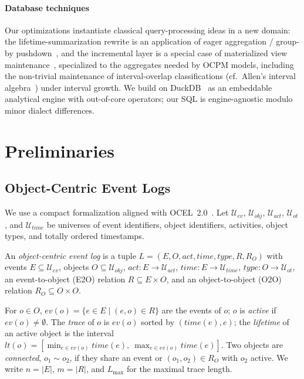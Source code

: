 \documentclass[sigconf, nonacm]{acmart}
\newcommand{\ocel}{OCEL~2.0\xspace}
\begin{document}
\paragraph{Database techniques}
Our optimizations instantiate classical query-processing ideas in a new domain: the lifetime-summarization rewrite is an application of eager aggregation / group-by pushdown~\cite{yan1995eager}, and the incremental layer is a special case of materialized view maintenance~\cite{gupta1995ivm,dbtoaster}, specialized to the aggregates needed by OCPM models, including the non-trivial maintenance of interval-overlap classifications (cf.\ Allen's interval algebra~\cite{allen1983}) under interval growth. We build on DuckDB~\cite{duckdb} as an embeddable analytical engine with out-of-core operators; our SQL is engine-agnostic modulo minor dialect differences.

\section{Preliminaries}
\label{sec:prelim}

\subsection{Object-Centric Event Logs}
We use a compact formalization aligned with \ocel~\cite{ocel2}. Let $\mathcal{U}_{ev}$, $\mathcal{U}_{obj}$, $\mathcal{U}_{act}$, $\mathcal{U}_{ot}$, and $\mathcal{U}_{time}$ be universes of event identifiers, object identifiers, activities, object types, and totally ordered timestamps.

\begin{definition}[OCEL]
\label{def:ocel}
An \emph{object-centric event log} is a tuple $L=(E, O, \mathit{act}, \mathit{time}, \mathit{type}, R, R_{O})$ with events $E\subseteq\mathcal{U}_{ev}$, objects $O\subseteq\mathcal{U}_{obj}$, $\mathit{act}\colon E\to\mathcal{U}_{act}$, $\mathit{time}\colon E\to\mathcal{U}_{time}$, $\mathit{type}\colon O\to\mathcal{U}_{ot}$, an event-to-object (E2O) relation $R\subseteq E\times O$, and an object-to-object (O2O) relation $R_O\subseteq O\times O$.
\end{definition}

For $o \in O$, $\mathit{ev}(o)=\{e\in E \mid (e,o)\in R\}$ are the events of $o$; $o$ is \emph{active} if $\mathit{ev}(o)\neq\emptyset$. The \emph{trace} of $o$ is $\mathit{ev}(o)$ sorted by $(\mathit{time}(e), e)$; the \emph{lifetime} of an active object is the interval $\mathit{lt}(o)=[\min_{e\in \mathit{ev}(o)}\mathit{time}(e),\ \max_{e\in \mathit{ev}(o)}\mathit{time}(e)]$. Two objects are \emph{connected}, $o_1 \sim o_2$, if they share an event or $(o_1,o_2)\in R_O$ with $o_2$ active. We write $n=|E|$, $m=|R|$, and $L_{\max}$ for the maximal trace length.
\end{document}
